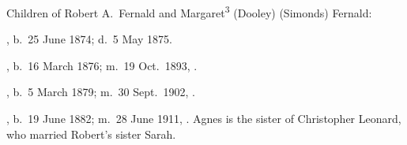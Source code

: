 \begin{KidsIntro}
	Children of Robert A.\ Fernald and Margaret\textsuperscript{3} (Dooley) (Simonds) Fernald:
\end{KidsIntro}	

\begin{Kids}
	
	, b.\ 25 June 1874;\cite{Anna4FernaldBirth} d.\ 5 May 1875.\cite{Anna4FernaldDeath}
	
	, b.\ 16 March 1876; m.\ 19 Oct.\ 1893, .
		
	, b.\ 5 March 1879; m.\ 30 Sept.\ 1902, .
	
	, b.\ 19 June 1882; m.\ 28 June 1911, . Agnes is the sister of Christopher Leonard, who married Robert's sister Sarah.
	
\end{Kids}
	
	
